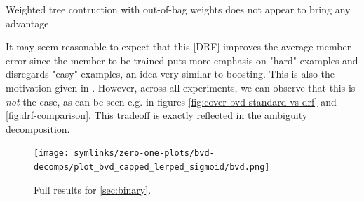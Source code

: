 \documentclass[
	twoside=false, %
]{kaobook}
\begin{document}
Weighted tree contruction with out-of-bag weights does not appear to bring any advantage.


It may seem reasonable to expect that this [DRF] improves the average member error since the member to be trained puts more emphasis on "hard" examples and disregards "easy" examples, an idea very similar to boosting. This is also the motivation given in \cite{bernard_DynamicRandomForests_2012, xu_ImplementationPerformanceOptimization_2017}. However, across all experiments, we can observe that this is \textit{not} the case, as can be seen e.g. in figures \ref{fig:cover-bvd-standard-vs-drf} and \ref{fig:drf-comparison}.
This tradeoff is exactly reflected in the ambiguity decomposition.


\begin{figure}
    \texttt{[image: symlinks/zero-one-plots/bvd-decomps/plot\_bvd\_capped\_lerped\_sigmoid/bvd.png]}
    \caption{
        Full results for \cref{sec:binary}. \bvdlegend
    }
    \label{fig:sigmoids-full-results}
\end{figure}
\end{document}
